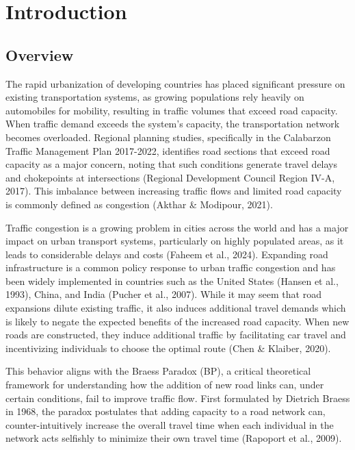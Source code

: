 
\chapter{Introduction}
\label{chap:introduction}

\section{Overview}
\label{sec:overview}

The rapid urbanization of developing countries has placed significant pressure on existing transportation systems, as growing populations rely heavily on automobiles for mobility, resulting in traffic volumes that exceed road capacity. When traffic demand exceeds the system's capacity, the transportation network becomes overloaded. Regional planning studies, specifically in the Calabarzon Traffic Management Plan 2017-2022,  identifies road sections that exceed road capacity as a major concern, noting that such conditions generate travel delays and chokepoints at intersections (Regional Development Council Region IV-A, 2017). This imbalance between increasing traffic flows and limited road capacity is commonly defined as congestion (Akthar \& Modipour, 2021). 

Traffic congestion is a growing problem in cities across the world and has a major impact on urban transport systems, particularly on highly populated areas, as it leads to considerable delays and costs (Faheem et al., 2024). Expanding road infrastructure is a common policy response to urban traffic congestion and has been widely implemented in countries such as the United States (Hansen et al., 1993), China, and India (Pucher et al., 2007). While it may seem that road expansions dilute existing traffic, it also induces additional travel demands which is likely to negate the expected benefits of the increased road capacity. When new roads are constructed, they induce additional traffic by facilitating car travel and incentivizing individuals to choose the optimal route (Chen \& Klaiber, 2020).

This behavior aligns with the Braess Paradox (BP), a critical theoretical framework for understanding how the addition of new road links can, under certain conditions, fail to improve traffic flow. First formulated by Dietrich Braess in 1968, the paradox postulates that adding capacity to a road network can, counter-intuitively increase the overall travel time when each individual in the network acts selfishly to minimize their own travel time (Rapoport et al., 2009). 

